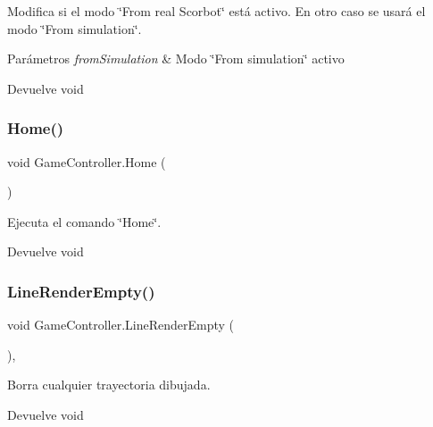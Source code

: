 Modifica si el modo \char`\"{}\+From real Scorbot\char`\"{} está activo. En otro caso se usará el modo \char`\"{}\+From simulation\char`\"{}. 
\begin{DoxyParams}{Parámetros}
{\em from\+Simulation} & Modo \char`\"{}\+From simulation\char`\"{} activo \\
\hline
\end{DoxyParams}
\begin{DoxyReturn}{Devuelve}
void 
\end{DoxyReturn}
\mbox{\label{class_game_controller_a92a798e28f38aa15306e58dbdef1099a}} 
\subsubsection{\texorpdfstring{Home()}{Home()}}
{\footnotesize\ttfamily void Game\+Controller.\+Home (\begin{DoxyParamCaption}{ }\end{DoxyParamCaption})\hspace{0.3cm}{\ttfamily [inline]}}

Ejecuta el comando \char`\"{}\+Home\char`\"{}. \begin{DoxyReturn}{Devuelve}
void 
\end{DoxyReturn}
\mbox{\label{class_game_controller_a4156d664c9b3dce275af61bff2c00a69}} 
\subsubsection{\texorpdfstring{LineRenderEmpty()}{LineRenderEmpty()}}
{\footnotesize\ttfamily void Game\+Controller.\+Line\+Render\+Empty (\begin{DoxyParamCaption}{ }\end{DoxyParamCaption})\hspace{0.3cm}{\ttfamily [inline]}, {\ttfamily [private]}}

Borra cualquier trayectoria dibujada. \begin{DoxyReturn}{Devuelve}
void 
\end{DoxyReturn}
\mbox{\label{class_game_controller_a7ae3bede521e0a3c4c80dc9ede03ba90}} 
